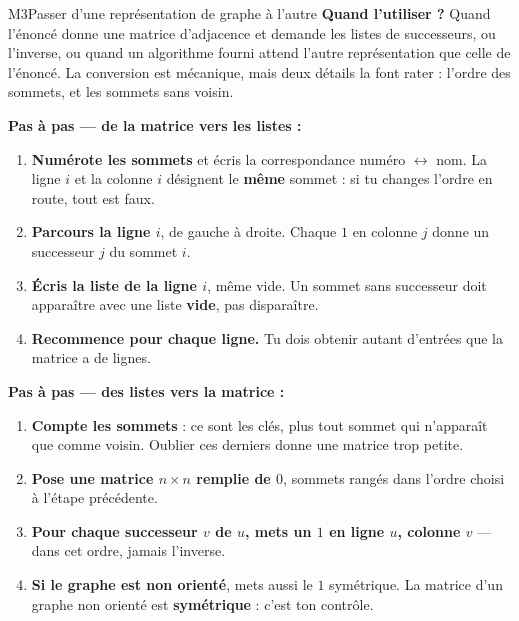 \begin{fichemethode}{M3}{Passer d'une représentation de graphe à l'autre}
\textbf{Quand l'utiliser ?} Quand l'énoncé donne une matrice d'adjacence et demande les listes
de successeurs, ou l'inverse, ou quand un algorithme fourni attend l'autre représentation que
celle de l'énoncé. La conversion est mécanique, mais deux détails la font rater : l'ordre des
sommets, et les sommets sans voisin.

\textbf{Pas à pas — de la matrice vers les listes :}
\begin{enumerate}
  \item \textbf{Numérote les sommets} et écris la correspondance numéro $\leftrightarrow$ nom.
    La ligne $i$ et la colonne $i$ désignent le \textbf{même} sommet : si tu changes l'ordre
    en route, tout est faux.
  \item \textbf{Parcours la ligne $i$}, de gauche à droite. Chaque $1$ en colonne $j$ donne un
    successeur $j$ du sommet $i$.
  \item \textbf{Écris la liste de la ligne $i$}, même vide. Un sommet sans successeur doit
    apparaître avec une liste \textbf{vide}, pas disparaître.
  \item \textbf{Recommence pour chaque ligne.} Tu dois obtenir autant d'entrées que la matrice
    a de lignes.
\end{enumerate}

\textbf{Pas à pas — des listes vers la matrice :}
\begin{enumerate}
  \item \textbf{Compte les sommets} : ce sont les clés, plus tout sommet qui n'apparaît que
    comme voisin. Oublier ces derniers donne une matrice trop petite.
  \item \textbf{Pose une matrice $n \times n$ remplie de $0$}, sommets rangés dans l'ordre
    choisi à l'étape précédente.
  \item \textbf{Pour chaque successeur $v$ de $u$, mets un $1$ en ligne $u$, colonne $v$} —
    dans cet ordre, jamais l'inverse.
  \item \textbf{Si le graphe est non orienté}, mets aussi le $1$ symétrique. La matrice d'un
    graphe non orienté est \textbf{symétrique} : c'est ton contrôle.
\end{enumerate}


\end{fichemethode}
